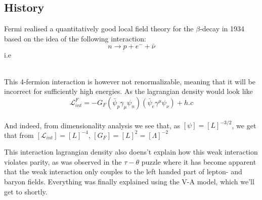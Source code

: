 \documentclass[11pt,a4paper,faculty=we,language=en,doctype=report]{cls/ugent-doc}
\begin{document}
\subsection{History}
Fermi realised a quantitatively good local field theory for the $\beta$-decay in 1934 based on the idea of the following
interaction:
\begin{equation}
	n \rightarrow p + e^- + \bar{\nu} \label{eqn:neutron decay}
\end{equation}
i.e
\begin{figure}[h!]
	\centering
\end{figure}\\
This 4-fermion interaction is however not renormalizable, meaning that it will be incorrect for sufficiently high
energies. As the lagrangian density would look like
\begin{equation}
	\mathcal{L}^F_{int} = -G_F (\bar{\psi}_p\gamma_\mu \psi_n) (\bar{\psi}_e\gamma^\mu\psi_\nu) + h.c
\end{equation}\\
And indeed, from dimensionality analysis we see that, as $[\psi]=[L]^{-3/2}$, we get that from $[\mathcal{L}_{int}] = [L]^{-4}$, $[G_F] = [L]^2 = [\Lambda]^{-2}$

This interaction lagrangian density also doens't explain how this weak interaction violates parity, as was observed in the $\tau-\theta$ puzzle where it has become apparent that the weak interaction only couples
to the left handed part of lepton- and baryon fields. Everything was finally explained using
the V-A model, which we'll get to shortly.
\end{document}
